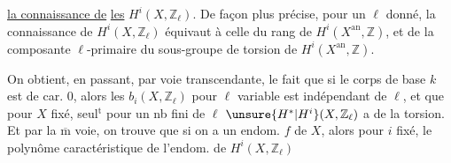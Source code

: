 \uline{la connaissance de}
\uline{les} $H^i(X,\mathbb Z_\ell)$.
De façon plus précise, pour un $\ell$ donné, la connaissance de $H^i(X,\mathbb Z_\ell)$ équivaut à celle du rang  de $H^i(X^{\mathrm{an}},\mathbb Z)$,  et de la composante $\ell$-primaire du sous-groupe de torsion de $H^i(X^{\mathrm{an}},\mathbb Z)$.

On obtient, en passant, par voie transcendante, le fait que si le corps de base $k$ est de car. $0$, alors les  $b_i(X,\mathbb Z_\ell)$  pour $\ell$ variable est indépendant de $\ell$, et que pour $X$ fixé, seul$^{\mathrm t}$ pour un nb fini de $\ell$  $\unsure{H^*|H^i}(X,\mathbb Z_\ell)$ a de la torsion.
Et par la $\overline{\mathrm m}$ voie, on trouve  que si on a un endom. $f$ de $X$, alors pour $i$ fixé,  le polynôme caractéristique de l'endom. de $H^i(X,\mathbb Z_\ell)$
